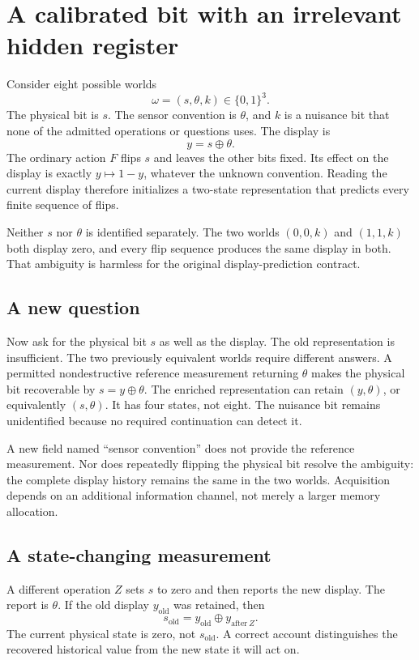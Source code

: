 \section{A calibrated bit with an irrelevant hidden register}\label{GA:sec:sensor}
Consider eight possible worlds
\[
\omega=(s,\theta,k)\in\{0,1\}^3.
\]
The physical bit is $s$. The sensor convention is $\theta$, and $k$ is a nuisance bit that none of the admitted operations or questions uses. The display is
\[
y=s\oplus\theta.
\]
The ordinary action $F$ flips $s$ and leaves the other bits fixed. Its effect on the display is exactly $y\mapsto1-y$, whatever the unknown convention. Reading the current display therefore initializes a two-state representation that predicts every finite sequence of flips.

Neither $s$ nor $\theta$ is identified separately. The two worlds $(0,0,k)$ and $(1,1,k)$ both display zero, and every flip sequence produces the same display in both. That ambiguity is harmless for the original display-prediction contract.

\subsection{A new question}
Now ask for the physical bit $s$ as well as the display. The old representation is insufficient. The two previously equivalent worlds require different answers. A permitted nondestructive reference measurement returning $\theta$ makes the physical bit recoverable by $s=y\oplus\theta$. The enriched representation can retain $(y,\theta)$, or equivalently $(s,\theta)$. It has four states, not eight. The nuisance bit remains unidentified because no required continuation can detect it.

A new field named ``sensor convention'' does not provide the reference measurement. Nor does repeatedly flipping the physical bit resolve the ambiguity: the complete display history remains the same in the two worlds. Acquisition depends on an additional information channel, not merely a larger memory allocation.

\subsection{A state-changing measurement}
A different operation $Z$ sets $s$ to zero and then reports the new display. The report is $\theta$. If the old display $y_{\mathrm{old}}$ was retained, then
\[
s_{\mathrm{old}}=y_{\mathrm{old}}\oplus y_{\mathrm{after}\ Z}.
\]
The current physical state is zero, not $s_{\mathrm{old}}$. A correct account distinguishes the recovered historical value from the new state it will act on.

